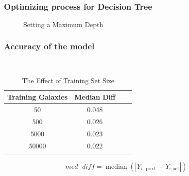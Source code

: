 \documentclass{beamer}
\begin{document}
\begin{frame}
	\frametitle{Optimizing process for Decision Tree}
    \begin{figure}
        \caption*{Setting a Maximum Depth}
    \end{figure}
    \end{frame}
\begin{frame}
	\frametitle{Accuracy of the model}
    \begin{table}[ht]\
        \caption*{The Effect of Training Set Size} %
        \centering %
        \begin{tabular}{c c c c} %
        \hline\hline %
        Training Galaxies & Median Diff \\ [0.5ex] %
        \hline %
        50 & 0.048  \\ %
        500 & 0.026  \\
        5000 & 0.023  \\
        50000 & 0.022  \\ [1ex] %
        \hline %
        \\
        \end{tabular}
        \label{table:nonlin} %
        \end{table}
        \begin{equation}
            m e d_{-} d i f f=\operatorname{median}\left(\left|Y_{\mathrm{i}, \text { pred }}-Y_{\mathrm{i}, \mathrm{act}}\right|\right)
            \end{equation}
    \end{frame}
\end{document}
